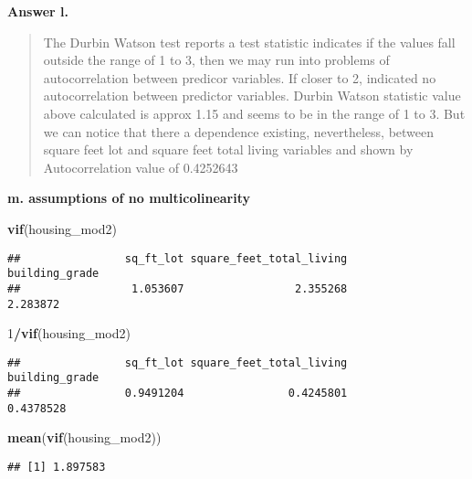 \documentclass[
]{article}
\newenvironment{Shaded}{\begin{snugshade}}{\end{snugshade}}
\newcommand{\DecValTok}[1]{\textcolor[rgb]{0.00,0.00,0.81}{#1}}
\newcommand{\KeywordTok}[1]{\textcolor[rgb]{0.13,0.29,0.53}{\textbf{#1}}}
\newcommand{\NormalTok}[1]{#1}
\newcommand{\OperatorTok}[1]{\textcolor[rgb]{0.81,0.36,0.00}{\textbf{#1}}}
\begin{document}
\textbf{Answer l.}

\begin{quote}
The Durbin Watson test reports a test statistic indicates if the values
fall outside the range of 1 to 3, then we may run into problems of
autocorrelation between predicor variables. If closer to 2, indicated no
autocorrelation between predictor variables. Durbin Watson statistic
value above calculated is approx 1.15 and seems to be in the range of 1
to 3. But we can notice that there a dependence existing, nevertheless,
between square feet lot and square feet total living variables and shown
by Autocorrelation value of 0.4252643
\end{quote}

\textbf{m. assumptions of no multicolinearity }

\begin{Shaded}
\begin{Highlighting}[]
\KeywordTok{vif}\NormalTok{(housing_mod2)}
\end{Highlighting}
\end{Shaded}

\begin{verbatim}
##                sq_ft_lot square_feet_total_living           building_grade 
##                 1.053607                 2.355268                 2.283872
\end{verbatim}

\begin{Shaded}
\begin{Highlighting}[]
\DecValTok{1}\OperatorTok{/}\KeywordTok{vif}\NormalTok{(housing_mod2)}
\end{Highlighting}
\end{Shaded}

\begin{verbatim}
##                sq_ft_lot square_feet_total_living           building_grade 
##                0.9491204                0.4245801                0.4378528
\end{verbatim}

\begin{Shaded}
\begin{Highlighting}[]
\KeywordTok{mean}\NormalTok{(}\KeywordTok{vif}\NormalTok{(housing_mod2))}
\end{Highlighting}
\end{Shaded}

\begin{verbatim}
## [1] 1.897583
\end{verbatim}
\end{document}
